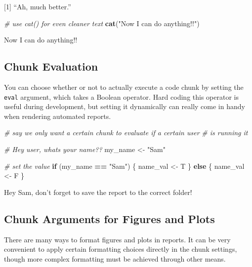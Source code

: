 \documentclass[
]{article}
\newenvironment{Shaded}{\begin{snugshade}}{\end{snugshade}}
\newcommand{\CommentTok}[1]{\textcolor[rgb]{0.56,0.35,0.01}{\textit{#1}}}
\newcommand{\ControlFlowTok}[1]{\textcolor[rgb]{0.13,0.29,0.53}{\textbf{#1}}}
\newcommand{\FunctionTok}[1]{\textcolor[rgb]{0.13,0.29,0.53}{\textbf{#1}}}
\newcommand{\NormalTok}[1]{#1}
\newcommand{\OtherTok}[1]{\textcolor[rgb]{0.56,0.35,0.01}{#1}}
\newcommand{\SpecialCharTok}[1]{\textcolor[rgb]{0.81,0.36,0.00}{\textbf{#1}}}
\newcommand{\StringTok}[1]{\textcolor[rgb]{0.31,0.60,0.02}{#1}}
\begin{document}
{[}1{]} ``Ah, much better.''

\begin{Shaded}
\begin{Highlighting}[]
\CommentTok{\# use cat() for even cleaner text}
\FunctionTok{cat}\NormalTok{(}\StringTok{"Now I can do anything!!"}\NormalTok{)}
\end{Highlighting}
\end{Shaded}

Now I can do anything!!

\subsection{Chunk Evaluation}\label{chunk-evaluation}

You can choose whether or not to actually execute a code chunk by
setting the \texttt{eval} argument, which takes a Boolean operator. Hard
coding this operator is useful during development, but setting it
dynamically can really come in handy when rendering automated reports.

\begin{Shaded}
\begin{Highlighting}[]
\CommentTok{\# say we only want a certain chunk to evaluate if a certain user}
\CommentTok{\# is running it}

\CommentTok{\# Hey user, what\textquotesingle{}s your name??}
\NormalTok{my\_name }\OtherTok{\textless{}{-}} \StringTok{"Sam"}

\CommentTok{\# set the value }
\ControlFlowTok{if}\NormalTok{ (my\_name }\SpecialCharTok{==} \StringTok{"Sam"}\NormalTok{) \{}
\NormalTok{  name\_val }\OtherTok{\textless{}{-}}\NormalTok{ T}
\NormalTok{\} }\ControlFlowTok{else}\NormalTok{ \{}
\NormalTok{  name\_val }\OtherTok{\textless{}{-}}\NormalTok{ F}
\NormalTok{\}}
\end{Highlighting}
\end{Shaded}

Hey Sam, don't forget to save the report to the correct folder!

\subsection{Chunk Arguments for Figures and
Plots}\label{chunk-arguments-for-figures-and-plots}

There are many ways to format figures and plots in reports. It can be
very convenient to apply certain formatting choices directly in the
chunk settings, though more complex formatting must be achieved through
other means.
\end{document}
